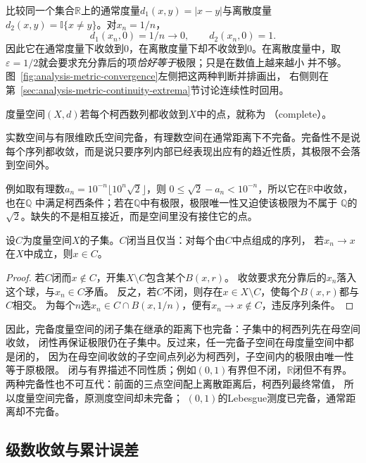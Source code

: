 比较同一个集合$\mathbb R$上的通常度量$d_1(x,y)=|x-y|$与离散度量
$d_2(x,y)=\mathbb I\{x\neq y\}$。对$x_n=1/n$，
\[
  d_1(x_n,0)=1/n\longrightarrow0,
  \qquad d_2(x_n,0)=1.
\]
因此它在通常度量下收敛到$0$，在离散度量下却不收敛到$0$。在离散度量中，取
$\varepsilon=1/2$就会要求充分靠后的项\emph{恰好等于}极限；只是在数值上越来越小
并不够。图~\ref{fig:analysis-metric-convergence}左侧把这两种判断并排画出，
右侧则在第~\ref{sec:analysis-metric-continuity-extrema}节讨论连续性时回用。

\begin{definition}[完备度量空间]
\label{def:analysis-complete-metric-space}
度量空间$(X,d)$若每个柯西数列都收敛到$X$中的点，就称为
（complete）。
\end{definition}
实数空间与有限维欧氏空间完备，有理数空间在通常距离下不完备。完备性不是说每个序列都收敛，而是说只要序列内部已经表现出应有的趋近性质，其极限不会落到空间外。

例如取有理数$a_n=10^{-n}\lfloor10^n\sqrt2\rfloor$，则
$0\leq\sqrt2-a_n<10^{-n}$，所以它在$\mathbb R$中收敛，也在$\mathbb Q$
中满足柯西条件；若在$\mathbb Q$中有极限，极限唯一性又迫使该极限为不属于
$\mathbb Q$的$\sqrt2$。缺失的不是相互接近，而是空间里没有接住它的点。

\begin{lemma}[闭集的序列判据]
\label{lem:analysis-closed-sequence-criterion}
设$C$为度量空间$X$的子集。$C$闭当且仅当：对每个由$C$中点组成的序列，
若$x_n\to x$在$X$中成立，则$x\in C$。
\end{lemma}
\begin{proof}
若$C$闭而$x\notin C$，开集$X\setminus C$包含某个$B(x,r)$。
收敛要求充分靠后的$x_n$落入这个球，与$x_n\in C$矛盾。
反之，若$C$不闭，则存在$x\in X\setminus C$，使每个$B(x,r)$都与$C$相交。
为每个$n$选$x_n\in C\cap B(x,1/n)$，便有$x_n\to x\notin C$，违反序列条件。
\end{proof}

因此，完备度量空间的闭子集在继承的距离下也完备：子集中的柯西列先在母空间收敛，
闭性再保证极限仍在子集中。反过来，任一完备子空间在母度量空间中都是闭的，
因为在母空间收敛的子空间点列必为柯西列，子空间内的极限由唯一性等于原极限。
闭与有界描述不同性质；例如$(0,1)$有界但不闭，$\mathbb R$闭但不有界。
两种完备性也不可互代：前面的三点空间配上离散距离后，柯西列最终常值，
所以度量空间完备，原测度空间却未完备；
$(0,1)$的Lebesgue测度已完备，通常距离却不完备。

\subsection{级数收敛与累计误差}
